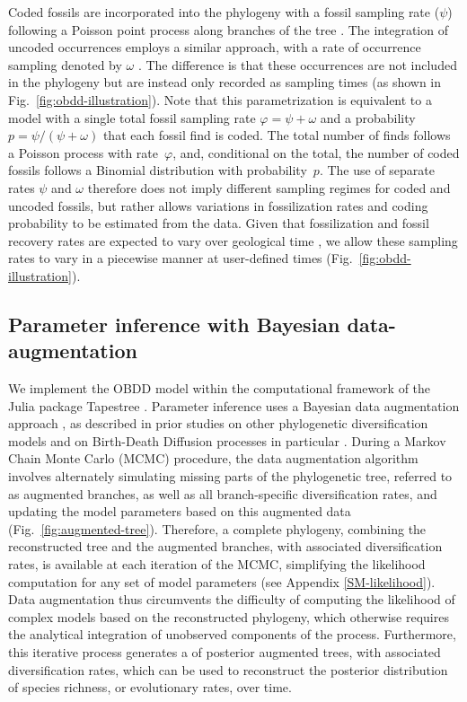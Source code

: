 \documentclass[oupdraft]{sysbio}
\newcommand{\revised}[1]{{\color{blue} #1}}
\begin{document}
\revised{Coded} fossils are incorporated into the phylogeny with a fossil sampling rate ($\psi$) following a Poisson point process along branches of the tree \citep{stadler_sampling-through-time_2010, heath_fossilized_2014}. The integration of \revised{uncoded} occurrences employs a similar approach, with a rate of occurrence sampling denoted by $\omega$ \citep{vaughan_estimating_2019}. The difference is that these occurrences are not included in the phylogeny but are instead only recorded as sampling times (as shown in Fig.~\ref{fig:obdd-illustration}). \revised{Note that this parametrization is equivalent to a model with a single total fossil sampling rate $\varphi = \psi + \omega$ and a probability $p = \psi/(\psi+\omega)$ that each fossil find is coded. The total number of finds follows a Poisson process with rate~$\varphi$, and, conditional on the total, the number of coded fossils follows a Binomial distribution with probability~$p$. The use of separate rates $\psi$ and $\omega$ therefore does not imply different sampling regimes for coded and uncoded fossils, but rather allows variations in fossilization rates and coding probability to be estimated from the data.} Given that fossilization and fossil recovery rates are expected to vary over geological time \citep{raup_taxonomic_1975, dominici_awkward_2020}, we allow these sampling rates to vary in a piecewise manner at user-defined times (Fig.~\ref{fig:obdd-illustration}).

\subsection{Parameter inference with Bayesian data-augmentation}

We implement the OBDD model within the computational framework of the Julia package Tapestree \citep{bezanson_julia_2017, quintero_tapestreejl_2020}. Parameter inference uses a Bayesian data augmentation approach \citep{tanner_calculation_1987}, as described in prior studies on other phylogenetic diversification models \citep{maliet_fast_2022, barido-sottani_clads_2023} and on Birth-Death Diffusion processes in particular \citep{quintero_imbalanced_2024, quintero_loss_2025}. During a Markov Chain Monte Carlo (MCMC) procedure, the data augmentation algorithm involves alternately simulating missing parts of the phylogenetic tree, referred to as augmented branches, as well as all branch-specific diversification rates, and updating the model parameters based on this augmented data \revised{(Fig.~\ref{fig:augmented-tree})}. Therefore, a complete phylogeny, combining the reconstructed tree and the augmented branches, with associated diversification rates, is available at each iteration of the MCMC, simplifying the likelihood computation for any set of model parameters (see Appendix \ref{SM-likelihood}). Data augmentation thus circumvents the difficulty of computing the likelihood of complex models based on the reconstructed phylogeny, which otherwise requires the analytical integration of unobserved components of the process. Furthermore, this iterative process generates a  of posterior augmented trees, with associated diversification rates, which can be used to reconstruct the posterior distribution of species richness, or evolutionary rates, over time.
\end{document}
